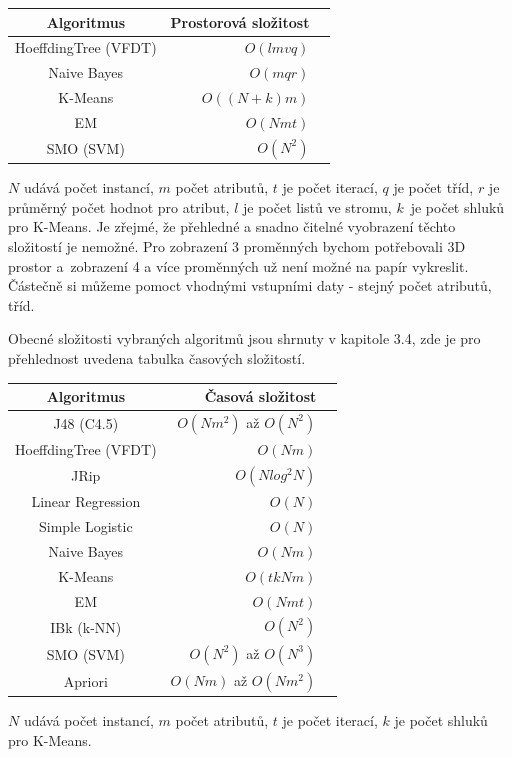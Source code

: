 \documentclass[12pt]{article}
\begin{document}
\begin{tabular}{c||rp{3cm}}
    \bfseries \bfseries Algoritmus & \bfseries Prostorová složitost \\[2mm]
    \hline \hline
    HoeffdingTree (VFDT) & $O(lmvq)$ \\
    Naive Bayes & $O(mqr)$ \\
    K-Means & $O((N+k)m)$ \\
    EM & $O(Nmt)$ \\
    SMO (SVM) & $O(N^2)$ \\
    \end{tabular}
\newline
\newline
$N$ udává počet instancí, $m$ počet atributů, $t$ je počet iterací, $q$ je počet tříd, $r$ je průměrný počet hodnot pro atribut, $l$ je počet listů ve stromu, $k$~je počet shluků pro K-Means. 
\newline
\newline
Je zřejmé, že přehledné a snadno čitelné vyobrazení těchto složitostí je nemožné. Pro zobrazení 3 proměnných bychom potřebovali 3D prostor a~zobrazení 4 a více proměnných už není možné na papír vykreslit. Částečně si můžeme pomoct vhodnými vstupními daty - stejný počet atributů, tříd. 

Obecné složitosti vybraných algoritmů jsou shrnuty v kapitole 3.4, zde je pro přehlednost uvedena tabulka časových složitostí.
\newline
\newline
\begin{tabular}{c||rp{3cm}}
    \bfseries \bfseries Algoritmus & \bfseries Časová složitost \\[2mm]
    \hline \hline
    J48 (C4.5) & $O(Nm^2)$ až $O(N^2)$ \\
    HoeffdingTree (VFDT) & $O(Nm)$ \\
    JRip & $O(N log^2 N)$ \\
    Linear Regression & $O(N)$ \\
    Simple Logistic & $O(N)$ \\
    Naive Bayes & $O(Nm)$ \\
    K-Means & $O(tkNm)$ \\
    EM & $O(Nmt)$ \\
    IBk (k-NN) & $O(N^2)$ \\
    SMO (SVM) & $O(N^2)$ až $O(N^3)$ \\
    Apriori &$O(Nm)$ až $O(Nm^2)$ \\
    \end{tabular}
\newline
\newline
$N$ udává počet instancí, $m$ počet atributů, $t$ je počet iterací, $k$ je počet shluků pro K-Means. 
\end{document}
